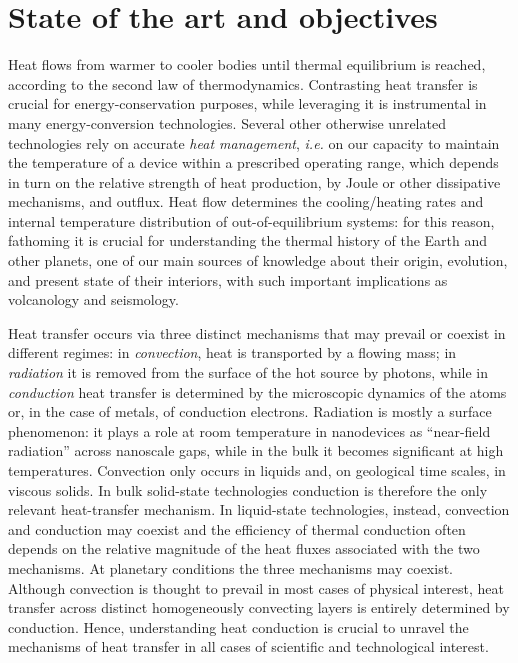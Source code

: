 

\section{State of the art and objectives}

Heat flows from warmer to cooler bodies until thermal equilibrium is reached, according to the second law of thermodynamics. Contrasting heat transfer is crucial for energy-conservation purposes, while leveraging it is instrumental in many energy-conversion technologies. Several other otherwise unrelated technologies rely on accurate \emph{heat management}, \emph{i.e.} on our capacity to maintain the temperature of a device within a prescribed operating range, which depends in turn on the relative strength of heat production, by Joule or other dissipative mechanisms, and outflux.\cite{Cahill2003,Pop:2010dv,Cahill:2014bx,Shi:2015io,Volz:2016ky} Heat flow determines the cooling/heating rates and internal temperature distribution of out-of-equilibrium systems: for this reason, fathoming it is crucial for understanding the thermal history of the Earth and other planets, one of our main sources of knowledge about their origin, evolution, and present state of their interiors,\cite{Hubbard:1984} with such important implications as volcanology and seismology.\cite{Duarte2016}

Heat transfer occurs via three distinct mechanisms that may prevail or coexist in different regimes:\cite{Lienhard2017} in \emph{convection}, heat is transported by a flowing mass; in \emph{radiation} it is removed from the surface of the hot source by photons, while in \emph{conduction} heat transfer is determined by the microscopic dynamics of the atoms or, in the case of metals, of conduction electrons.\cite{ziman,Tritt2004} Radiation is mostly a surface phenomenon: it plays a role at room temperature in nanodevices as ``near-field radiation'' across nanoscale gaps,\cite{Rousseau:2009es} while in the bulk it becomes significant at high temperatures. Convection only occurs in liquids and, on geological time scales, in viscous solids.\cite{Schibert2001} In bulk solid-state technologies conduction is therefore the only relevant heat-transfer mechanism. In liquid-state technologies, instead, convection and conduction may coexist and the efficiency of thermal conduction often depends on the relative magnitude of the heat fluxes associated with the two mechanisms. At planetary conditions the three mechanisms may coexist.\cite{Hubbard:1984} Although convection is thought to prevail in most cases of physical interest, heat transfer across distinct homogeneously convecting layers is entirely determined by conduction. Hence, understanding heat conduction is crucial to unravel the mechanisms of heat transfer in all cases of scientific and technological interest. 

